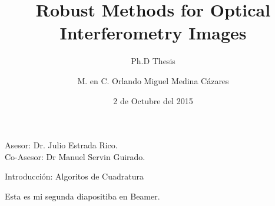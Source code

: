 \documentclass{beamer}
\title{Robust Methods for Optical \\ Interferometry
    Images}
\subtitle[short version]{Ph.D Thesis}
\author{M. en C. Orlando Miguel Medina C\'azares}
\date{2 de Octubre del 2015}
\institute[CIO]{Centro de Investigaciones en \'Optica}
\begin{document}
\begin{frame}[plain]
  \maketitle
  \footnotesize{
    Asesor: Dr. Julio Estrada Rico. \\
    Co-Asesor: Dr Manuel Servin Guirado.
  }
\end{frame}

\begin{frame}{Introducci\'on: Algoritos de Cuadratura}
 
\end{frame}

\begin{frame}
  Esta es mi segunda diapositiba en Beamer.

\end{frame}
\end{document}
